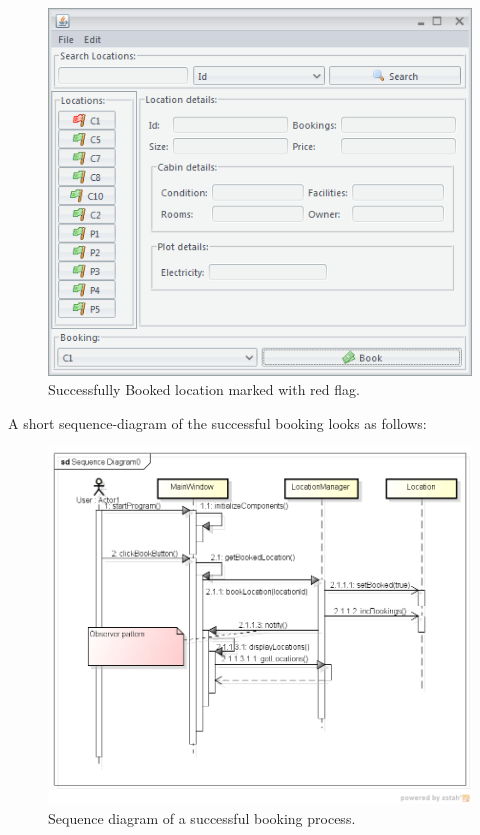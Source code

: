 \begin{figure}[H]
\begin{center}
\includegraphics[width=\textwidth]{gfx/location_booked.png} 
\end{center}
\caption{Successfully Booked location marked with red flag.}
\label{fig:booked_location}
\end{figure}

A short sequence-diagram of the successful booking looks as follows:

\begin{figure}[H]
\begin{center}
\includegraphics[width=\textwidth]{gfx/booking_sequence.png} 
\end{center}
\caption{Sequence diagram of a successful booking process.}
\label{fig:booking_sequence}
\end{figure}

